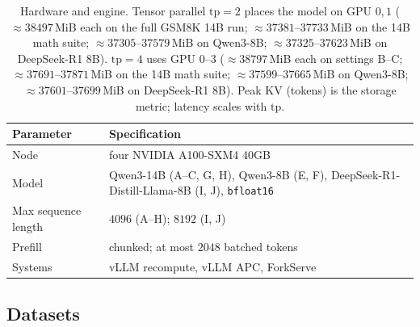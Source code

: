 \documentclass[11pt,a4paper]{article}
\begin{document}
\begin{table}[h]
\centering
\small
\begin{tabular}{@{}ll@{}}
\toprule
Parameter & Specification \\
\midrule
Node & four NVIDIA A100-SXM4 40GB \\
Model & Qwen3-14B (A--C, G, H), Qwen3-8B (E, F), DeepSeek-R1-Distill-Llama-8B (I, J), \texttt{bfloat16} \\
Max sequence length & $4096$ (A--H); $8192$ (I, J) \\
Prefill & chunked; at most $2048$ batched tokens \\
Systems & vLLM recompute, vLLM APC, ForkServe \\
\bottomrule
\end{tabular}
\caption{Hardware and engine.
Tensor parallel $\mathrm{tp}{=}2$ places the model on GPU $0,1$ ($\approx 38497$\,MiB each on the full GSM8K 14B run; $\approx 37381$--$37733$\,MiB on the 14B math suite; $\approx 37305$--$37579$\,MiB on Qwen3-8B; $\approx 37325$--$37623$\,MiB on DeepSeek-R1 8B).
$\mathrm{tp}{=}4$ uses GPU $0$--$3$ ($\approx 38797$\,MiB each on settings B--C; $\approx 37691$--$37871$\,MiB on the 14B math suite; $\approx 37599$--$37665$\,MiB on Qwen3-8B; $\approx 37601$--$37699$\,MiB on DeepSeek-R1 8B).
Peak KV (tokens) is the storage metric; latency scales with $\mathrm{tp}$.}
\end{table}

\subsection{Datasets}
\end{document}
